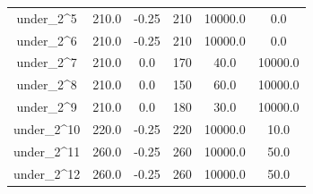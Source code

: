 \documentclass[a4paper,11pt]{article}
\begin{document}
\begin{longtable}{cccccc}
under\_2\textasciicircum{}5 & 210.0 & -0.25 & 210 & 10000.0 & 0.0\\
under\_2\textasciicircum{}6 & 210.0 & -0.25 & 210 & 10000.0 & 0.0\\
\addlinespace
under\_2\textasciicircum{}7 & 210.0 & 0.0 & 170 & 40.0 & 10000.0\\
under\_2\textasciicircum{}8 & 210.0 & 0.0 & 150 & 60.0 & 10000.0\\
under\_2\textasciicircum{}9 & 210.0 & 0.0 & 180 & 30.0 & 10000.0\\
under\_2\textasciicircum{}10 & 220.0 & -0.25 & 220 & 10000.0 & 10.0\\
under\_2\textasciicircum{}11 & 260.0 & -0.25 & 260 & 10000.0 & 50.0\\
\addlinespace
under\_2\textasciicircum{}12 & 260.0 & -0.25 & 260 & 10000.0 & 50.0\\*
\end{longtable}
\endgroup{}
\end{document}
